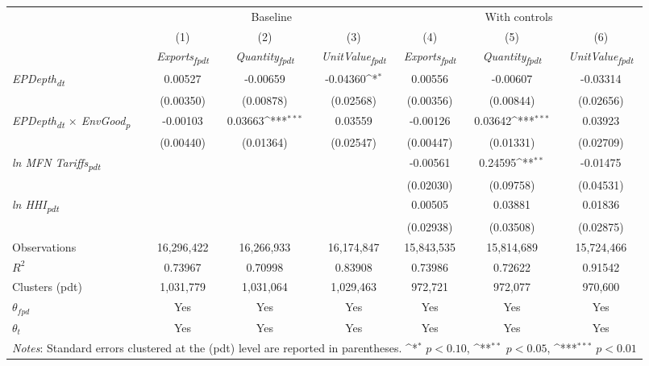 {
\def\sym#1{\ifmmode^{#1}\else\(^{#1}\)\fi}
\begin{tabular}{l*{6}{c}}
\toprule
&\multicolumn{3}{c}{Baseline}&\multicolumn{3}{c}{With controls}\\\cmidrule(lr){2-4}\cmidrule(lr){5-7}
&(1)&(2)&(3)&(4)&(5)&(6)\\
&\textit{Exports\textsubscript{fpdt}}&\textit{Quantity\textsubscript{fpdt}}&\textit{UnitValue\textsubscript{fpdt}}&\textit{Exports\textsubscript{fpdt}}&\textit{Quantity\textsubscript{fpdt}}&\textit{UnitValue\textsubscript{fpdt}}\\
\midrule
\textit{EPDepth\textsubscript{dt}} & 0.00527 & -0.00659 & -0.04360\sym{*} & 0.00556 & -0.00607 & -0.03314\\
 & (0.00350) & (0.00878) & (0.02568) & (0.00356) & (0.00844) & (0.02656)\\
\addlinespace
\textit{EPDepth\textsubscript{dt} $\times$ EnvGood\textsubscript{p}} & -0.00103 & 0.03663\sym{***} & 0.03559 & -0.00126 & 0.03642\sym{***} & 0.03923\\
 & (0.00440) & (0.01364) & (0.02547) & (0.00447) & (0.01331) & (0.02709)\\
\addlinespace
\textit{ln MFN Tariffs\textsubscript{pdt}} &  &  &  & -0.00561 & 0.24595\sym{**} & -0.01475\\
 &  &  &  & (0.02030) & (0.09758) & (0.04531)\\
\addlinespace
\textit{ln HHI\textsubscript{pdt}} &  &  &  & 0.00505 & 0.03881 & 0.01836\\
 &  &  &  & (0.02938) & (0.03508) & (0.02875)\\
\midrule
Observations & 16,296,422 & 16,266,933 & 16,174,847 & 15,843,535 & 15,814,689 & 15,724,466\\
$R^{2}$ & 0.73967 & 0.70998 & 0.83908 & 0.73986 & 0.72622 & 0.91542\\
Clusters (pdt) & 1,031,779 & 1,031,064 & 1,029,463 & 972,721 & 972,077 & 970,600\\
$\theta_{fpd}$ & Yes & Yes & Yes & Yes & Yes & Yes\\
$\theta_{t}$ & Yes & Yes & Yes & Yes & Yes & Yes\\
\bottomrule
\multicolumn{7}{l}{\footnotesize \textit{Notes}: Standard errors clustered at the (pdt) level are reported in parentheses. \sym{*} \(p<0.10\), \sym{**} \(p<0.05\), \sym{***} \(p<0.01\)}\\
\end{tabular}
}
